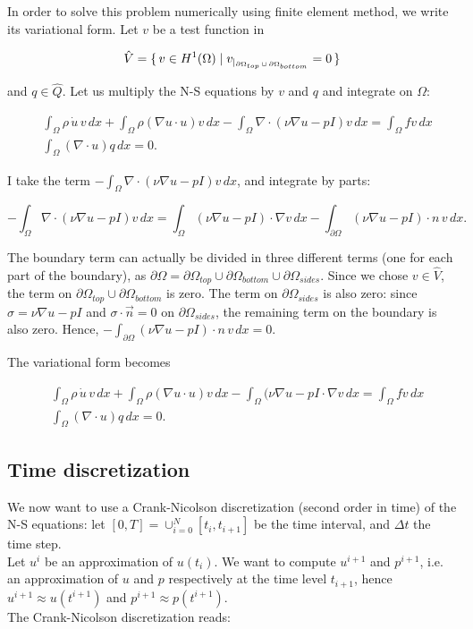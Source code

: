 \documentclass[11pt,a4paper,titlepage]{report}
\begin{document}
In order to solve this problem numerically using finite element method, we write its variational form. Let $v$ be a test function in

\[
\hat{V} = \set{v \in H^1(\Omega) | v_{|_{\partial \Omega_{top} \, \cup \, \partial \Omega_{bottom}}} = 0}
\]

and $q \in \hat{Q}$. Let us multiply the N-S equations by $v$ and $q$ and integrate on $\Omega$:

\begin{align}
&\int_{\Omega} \rho \, \dot{u} \, v \, dx + \int_{\Omega} \rho (\nabla u \cdot u)v \, dx - \int_{\Omega} \nabla \cdot (\nu \nabla u - pI)v \, dx = \int_{\Omega} fv \, dx \\
&\int_{\Omega} (\nabla \cdot u) q \, dx = 0.
\end{align}

I take the term $- \int_{\Omega} \nabla \cdot (\nu \nabla u - pI)v \, dx$, and integrate by parts:

\[
- \int_{\Omega} \nabla \cdot (\nu \nabla u - pI)v \, dx = \int_{\Omega} (\nu \nabla u - pI) \cdot \nabla v \, dx - \int_{\partial \Omega} (\nu \nabla u - pI) \cdot n \, v \, dx.
\]

The boundary term can actually be divided in three different terms (one for each part of the boundary), as $\partial \Omega = \partial \Omega_{top} \cup \partial \Omega_{bottom} \cup \partial \Omega_{sides}$. Since we chose $v \in \hat{V}$, the term on $\partial \Omega_{top} \cup \partial \Omega_{bottom}$ is zero. The term on $\partial \Omega_{sides}$ is also zero: since $\sigma = \nu \nabla u - pI$ and $\sigma \cdot \vec{n} = 0$ on $\partial \Omega_{sides}$, the remaining term on the boundary is also zero. Hence, $- \int_{\partial \Omega} (\nu \nabla u - pI) \cdot n \, v \, dx = 0$.

The variational form becomes

\begin{align}
&\int_{\Omega} \rho \, \dot{u} \, v \, dx + \int_{\Omega} \rho (\nabla u \cdot u)v \, dx - \int_{\Omega} (\nu \nabla u - pI \cdot \nabla v \, dx = \int_{\Omega} fv \, dx \\
&\int_{\Omega} (\nabla \cdot u) q \, dx = 0.
\end{align}

\subsection{Time discretization}
We now want to use a Crank-Nicolson discretization (second order in time) of the N-S equations: let $[0, T] = \cup^N_{i=0} [t_i, t_{i+1}] $ be the time interval, and $\Delta t$ the time step. \\
Let $u^i$ be an approximation of $u(t_i)$. We want to compute $u^{i+1}$ and $p^{i+1}$, i.e. an approximation of $u$ and $p$ respectively at the time level $t_{i+1}$, hence $u^{i+1} \approx u(t^{i+1})$ and $p^{i+1} \approx p(t^{i+1})$. \\
The Crank-Nicolson discretization reads:
\end{document}
